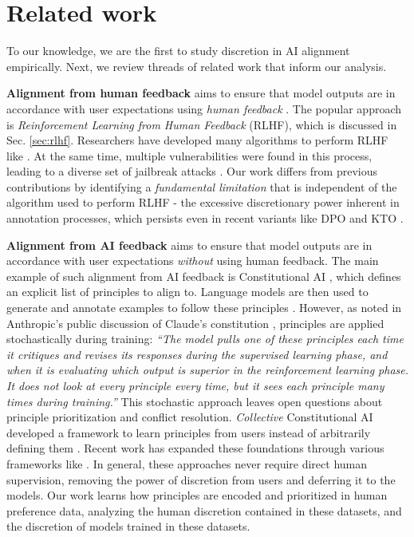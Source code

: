 \section{Related work}
\label{sec:relatedwork}

To our knowledge, we are the first to study discretion in AI alignment empirically. Next, we review threads of related work that inform our analysis.


\noindent \textbf{Alignment from human feedback} aims to ensure that model outputs are in accordance with user expectations using \emph{human feedback} \cite{christiano2017deep}. The popular approach is \emph{Reinforcement Learning from Human Feedback} (RLHF), which is discussed in Sec. \ref{sec:rlhf}. Researchers have developed many algorithms to perform RLHF like \cite{ziegler2019fine,ouyang2022training}. At the same time, multiple vulnerabilities were found in this process, leading to a diverse set of jailbreak attacks \cite{perez2022red}. Our work differs from previous contributions by identifying a \emph{fundamental limitation} that is independent of the algorithm used to perform RLHF - the excessive discretionary power inherent in annotation processes, which persists even in recent variants like DPO \cite{rafailov2024direct} and KTO \cite{ethayarajh2024kto}.

\noindent \textbf{Alignment from AI feedback}
 aims to ensure that model outputs are in accordance with user expectations \emph{without} using human feedback. The main example of such alignment from AI feedback is Constitutional AI \cite{bai2022constitutional}, which defines an explicit list of principles to align to. Language models are then used to generate and annotate examples to follow these principles  \cite{bai2022constitutional}. However, as noted in Anthropic's public discussion of Claude's constitution \cite{anthropic2024claude}, principles are applied stochastically during training: \emph{``The model pulls one of these principles each time it critiques and revises its responses during the supervised learning phase, and when it is evaluating which output is superior in the reinforcement learning phase. It does not look at every principle every time, but it sees each principle many times during training.''} This stochastic approach leaves open questions about principle prioritization and conflict resolution.
\textit{Collective} Constitutional AI developed a framework to learn principles from users instead of arbitrarily defining them \cite{huang2024collective}.
Recent work has expanded these foundations through various frameworks like \cite{mu2024rule, dong2023steerlmattributeconditionedsft}. In general, these approaches never require direct human supervision, removing the power of discretion from users and deferring it to the models.
Our work learns how principles are encoded and prioritized in human preference data, analyzing the human discretion contained in these datasets, and the discretion of models trained in these datasets.


